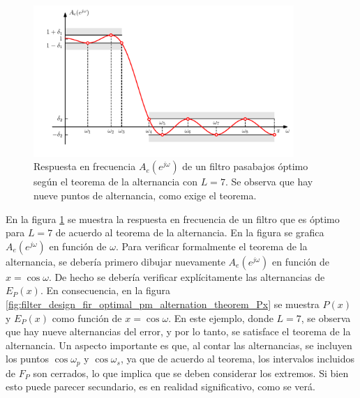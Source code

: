 \documentclass[a4paper]{report}
\begin{document}
\begin{figure}[!htb]
 \begin{center}
 \includegraphics[width=0.88\textwidth]{figuras/filter_design_fir_optimal_pm_alternation_theorem_Ae.pdf}
 \caption{\label{fig:filter_design_fir_optimal_pm_alternation_theorem_Ae} Respuesta en frecuencia \(A_e(e^{j\omega})\) de un filtro pasabajos óptimo según el teorema de la alternancia con \(L=7\). Se observa que hay nueve puntos de alternancia, como exige el teorema.}
 \end{center}
\end{figure}
En la figura \ref{fig:filter_design_fir_optimal_pm_alternation_theorem_Ae} se muestra la respuesta en frecuencia de un filtro que es óptimo para \(L=7\) de acuerdo al teorema de la alternancia. En la  figura se grafica \(A_e(e^{j\omega})\) en función de \(\omega\). Para verificar formalmente el teorema de la alternancia, se debería primero dibujar nuevamente \(A_e(e^{j\omega})\) en función de \(x=\cos\omega\). De hecho se debería verificar explícitamente las alternancias de \(E_P(x)\). En consecuencia, en la figura \ref{fig:filter_design_fir_optimal_pm_alternation_theorem_Px} se muestra \(P(x)\) y \(E_P(x)\) como función de \(x=\cos\omega\). En este ejemplo, donde \(L=7\), se observa que hay nueve alternancias del error, y por lo tanto, se satisface el teorema de la alternancia. Un aspecto importante es que, al contar las alternancias, se incluyen los puntos \(\cos\omega_p\) y \(\cos\omega_s\), ya que de acuerdo al teorema, los intervalos incluidos de \(F_P\) son cerrados, lo que implica que se deben considerar los extremos. Si bien esto puede parecer secundario, es en realidad significativo, como se verá.
\end{document}
